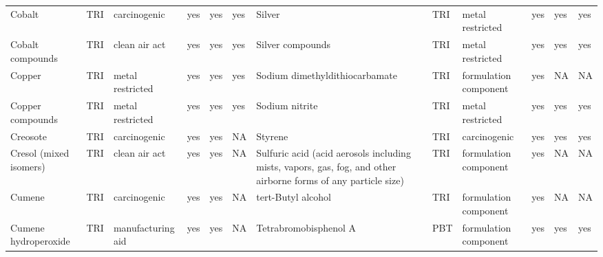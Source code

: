 \begin{table}[H]
{\begin{tabular}{llllllllllll}
            Cobalt                                                                     & TRI            & carcinogenic          & yes    & yes     & yes  & Silver                                                                                                             & TRI            & metal restricted      & yes    & yes     & yes  \\
            Cobalt compounds                                                           & TRI            & clean air act         & yes    & yes     & yes  & Silver compounds                                                                                                   & TRI            & metal restricted & yes & yes & yes\\
            Copper                                                                     & TRI            & metal restricted      & yes    & yes     & yes  & Sodium dimethyldithiocarbamate                                                                                     & TRI            & formulation component & yes & NA & NA\\
            Copper compounds                                                           & TRI            & metal restricted      & yes    & yes     & yes  & Sodium nitrite                                                                                                     & TRI            & metal restricted & yes & yes & yes\\
            Creosote                                                                   & TRI            & carcinogenic          & yes    & yes     & NA   & Styrene                                                                                                            & TRI            & carcinogenic          & yes    & yes     & yes  \\
            Cresol (mixed isomers)                                                     & TRI            & clean air act         & yes    & yes     & NA   & Sulfuric acid (acid aerosols including mists, vapors, gas, fog, and other airborne forms of any particle size) & TRI & formulation component & yes & NA & NA\\
            Cumene                                                                     & TRI            & carcinogenic          & yes    & yes     & NA   & tert-Butyl alcohol                                                                                                 & TRI            & formulation component & yes & NA & NA\\
            Cumene hydroperoxide                                                       & TRI            & manufacturing aid     & yes    & yes     & NA   & Tetrabromobisphenol A                                                                                              & PBT            & formulation component & yes & yes & yes\\

\end{tabular}}
\end{table}
